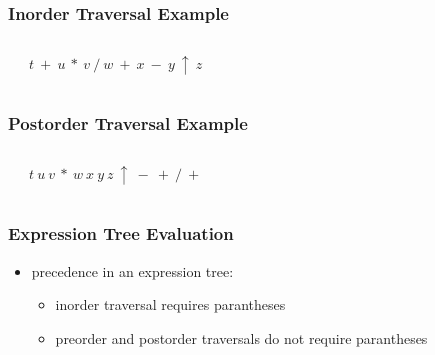 \documentclass[dvipsnames]{beamer}
\begin{document}
\begin{frame}
  \frametitle{Inorder Traversal Example}

  \begin{example}
    \begin{columns}
      \begin{center}
      \end{center}

      \pause
      $t ~ + ~ u ~ * ~ v ~ / ~ w ~ + ~ x ~ - ~ y ~ \uparrow ~ z$
    \end{columns}
  \end{example}
\end{frame}

\begin{frame}
  \frametitle{Postorder Traversal Example}

  \begin{example}
    \begin{columns}
      \begin{center}
      \end{center}

      \pause
      $t ~ u ~ v ~ * ~ w ~ x ~ y ~ z ~ \uparrow ~ - ~ + ~ / ~ +$
    \end{columns}
  \end{example}
\end{frame}

\begin{frame}
  \frametitle{Expression Tree Evaluation}

  \begin{itemize}
    \item precedence in an expression tree:
    \begin{itemize}
      \item inorder traversal requires parantheses
      \item preorder and postorder traversals do not require parantheses
    \end{itemize}
  \end{itemize}
\end{frame}
\end{document}

